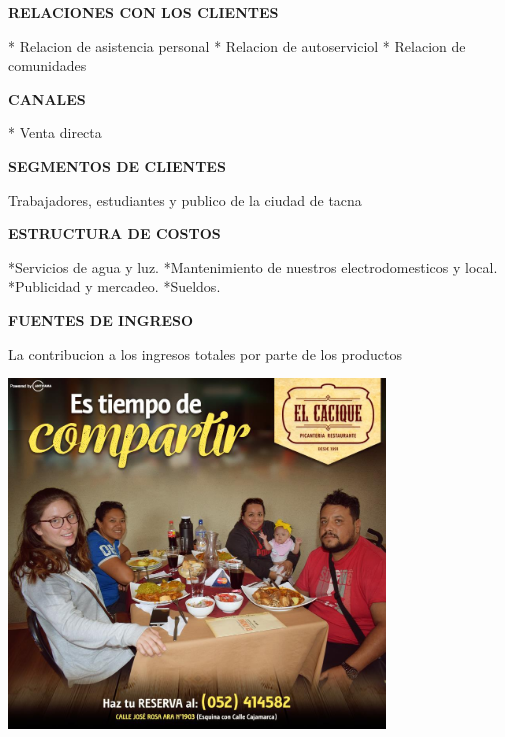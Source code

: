 \begin{enumerate}[1.]
\begin{center}
\textbf {RELACIONES CON LOS CLIENTES} \newline
\end{center}
* Relacion de asistencia personal\newline
* Relacion de autoserviciol\newline
* Relacion de comunidades\newline
\\ 
\begin{center}
\textbf {CANALES} \newline
\end{center}
* Venta directa\newline
\\ 
\begin{center}
\textbf {SEGMENTOS DE CLIENTES} \newline
\end{center}
Trabajadores, estudiantes y publico de la ciudad de tacna  \newline
\\ 
\begin{center}
\textbf {ESTRUCTURA DE COSTOS} \newline
\end{center}
*Servicios de agua y luz.  \newline
*Mantenimiento de nuestros electrodomesticos y local.  \newline
*Publicidad y mercadeo.  \newline
*Sueldos.  \newline
\\ 
\begin{center}
\textbf {FUENTES DE INGRESO} \newline
\end{center}
La contribucion a los ingresos totales por parte de los productos

	\begin{center}
	\includegraphics[width=10cm]{./Imagenes/clientes} 
	\end{center}


\end{enumerate}

